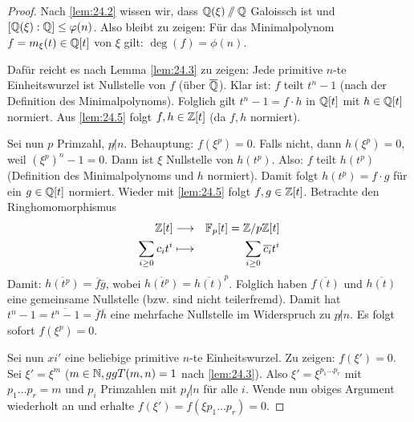 \documentclass[12pt,a4paper]{scrartcl}
\begin{document}
\begin{proof}
	Nach \ref{lem:24.2} wissen wir, dass $\mathbb Q(\xi)\sslash\mathbb Q$ Galoissch ist und $[\mathbb Q(\xi):\mathbb Q]\leq \varphi(n)$. Also bleibt zu zeigen: Für das Minimalpolynom $f = m_{\xi}(t)\in\mathbb Q[t]$ von $\xi$ gilt: $\deg(f) = \phi(n)$.
	
	Dafür reicht es nach Lemma \ref{lem:24.3} zu zeigen: Jede primitive $n$-te Einheitswurzel ist Nullstelle von $f$ (über $\overline{\mathbb Q}$). Klar ist: $f$ teilt $t^n-1$ (nach der Definition des Minimalpolynoms). Folglich gilt $t^n-1 = f\cdot h$ in $\mathbb Q[t]$ mit $h\in \mathbb Q[t]$ normiert. Aus \ref{lem:24.5} folgt $f,h\in\mathbb Z[t]$ (da $f,h$ normiert).
	
	Sei nun $p$ Primzahl, $p\not|n$. Behauptung: $f(\xi^p) = 0$. Falls nicht, dann $h(\xi^p) = 0$, weil $(\xi^p)^n-1 = 0$. Dann ist $\xi$ Nullstelle von $h(t^p)$. Also: $f$ teilt $h(t^p)$ (Definition des Minimalpolynoms und $h$ normiert). Damit folgt $h(t^p) = f\cdot g$ für ein $g\in\mathbb Q[t]$ normiert. Wieder mit \ref{lem:24.5} folgt $f,g\in\mathbb Z[t]$. Betrachte den Ringhomomorphismus
	\begin{eqnarray*}
		\mathbb Z[t] & \longrightarrow & \mathbb F_p[t] = \mathbb Z/p\mathbb Z[t]\\
		\sum_{i\geq0}c_it^i & \longmapsto & \sum_{i\geq 0} \overline{c_i}t^i
	\end{eqnarray*}
	Damit: $\overline{h(t^p)} = \overline{f}\overline{g}$, wobei $\overline{h(t^p)} = \overline{h(t)}^p$. Folglich haben $\overline{f(t)}$ und $\overline{h(t)}$ eine gemeinsame Nullstelle (bzw. sind nicht teilerfremd). Damit hat $t^n-1 = \overline{t^n-1} = \overline{f}\overline{h}$ eine mehrfache Nullstelle im Widerspruch zu $p\not|n$. Es folgt sofort $f(\xi^p) = 0$.
	
	Sei nun $xi'$ eine beliebige primitive $n$-te Einheitswurzel. Zu zeigen: $f(\xi') = 0$. Sei $\xi' = \xi^m$ ($m\in \mathbb N, ggT(m,n) =1$ nach \ref{lem:24.3}). Also $\xi'  =\xi^{p_1\dots p_r}$ mit $p_1\dots p_r = m$ und $p_i$ Primzahlen mit $p_i\not| n$ für alle $i$. Wende nun obiges Argument wiederholt an und erhalte $f(\xi') = f(\xi{p_1\dots p_r}) = 0$.
\end{proof}
\end{document}
